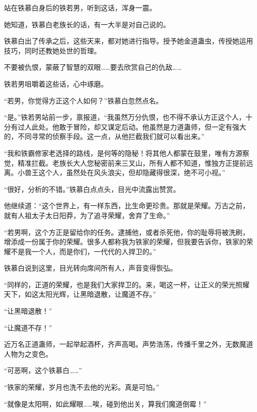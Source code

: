 \begin{this_body}
站在铁慕白身后的铁若男，听到这话，浑身一震。

她知道，铁慕白老族长的话，有一大半是对自己说的。

铁慕白出了传承之后，这些天来，都对她进行指导。授予她金道蛊虫，传授她运用技巧，同时还教她处世的哲理。

不要被仇恨，蒙蔽了智慧的双眼……要去欣赏自己的仇敌……

铁若男咀嚼着这些话，心中琢磨。

“若男，你觉得方正这个人如何？”铁慕白忽然点名。

“是。”铁若男站前一步，禀报道，“我虽然万分仇恨，也不得不承认方正这个人，十分有过人此处。他敢于冒险，却又谋定后动。他虽然是力道蛊师，但一定有强大的，不同寻常的侦察手段。这一点，从他拦截我们就可以看出来。”

“我和铁霸修家老选择的路线，是何等的隐秘！将其他人都蒙在鼓里，唯有方源察觉，精准拦截。老族长大人您秘密前来三叉山，所有人都不知道，惟独方正提前远离。小兽王这个人，虽然处在风头浪尖，但却隐藏得很深，绝不可小视。”

“很好，分析的不错。”铁慕白点点头，目光中流露出赞赏。

他继续道：“这个世界上，有一样东西，比生命更珍贵。那就是荣耀。万古之前，就有人祖太子太日阳莽，为了追寻荣耀，舍弃了生命。”

“若男啊，这个方正是留给你的任务。逮捕他，或者杀死他，你的耻辱将被洗刷，增添成一份属于你的荣耀。很多人都称我为铁家的荣耀，但我要告诉你，铁家的荣耀不是我一个人，而是你们，一代代的人捍卫的。”

铁慕白说到这里，目光转向席间所有人，声音变得恢弘。

“同样的，正道的荣耀，也是我们大家捍卫的。来，喝这一杯，让正义的荣光照耀天下，如这太阳光辉，让黑暗退散，让魔道不存。”

“让黑暗退散！”

“让魔道不存！”

近万名正道蛊师，一起举起酒杯，齐声高喝。声势浩荡，传播千里之外，无数魔道人物为之变色。

“可恶啊，这个铁慕白……”

“铁家的荣耀，岁月也洗不去他的光彩。真是可怕。”

“就像是太阳啊，如此耀眼……唉，碰到他出关，算我们魔道倒霉！”

\end{this_body}

